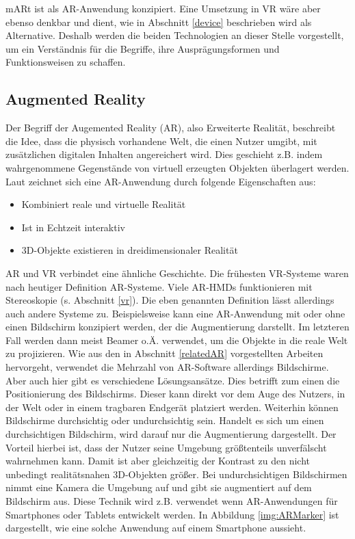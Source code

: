 mARt ist als AR-Anwendung konzipiert. Eine Umsetzung in VR wäre aber ebenso denkbar und dient, wie in Abschnitt \ref{device} beschrieben wird als Alternative.
Deshalb werden die beiden Technologien an dieser Stelle vorgestellt, um ein Verständnis für die Begriffe, ihre Ausprägungsformen und Funktionsweisen zu schaffen.

\subsection{Augmented Reality}

Der Begriff der Augemented Reality (AR), also Erweiterte Realität, beschreibt die Idee, dass die physisch vorhandene Welt, die einen Nutzer umgibt, mit zusätzlichen digitalen Inhalten angereichert wird. Dies geschieht z.B. indem wahrgenommene Gegenstände von virtuell erzeugten Objekten überlagert werden. 
Laut \cite{azuma97} zeichnet sich eine AR-Anwendung durch folgende Eigenschaften aus:

\begin{itemize}
\item Kombiniert reale und virtuelle Realität
\item Ist in Echtzeit interaktiv
\item 3D-Objekte existieren in dreidimensionaler Realität
\end{itemize}

AR und VR verbindet eine ähnliche Geschichte. Die frühesten VR-Systeme waren nach heutiger Definition AR-Systeme. 
Viele AR-HMDs funktionieren mit Stereoskopie (s. Abschnitt \ref{vr}). Die eben genannten Definition lässt allerdings auch andere Systeme zu. 
Beispielsweise kann eine AR-Anwendung mit oder ohne einen Bildschirm konzipiert werden, der die Augmentierung darstellt. Im letzteren Fall werden dann meist Beamer o.Ä. verwendet, um die Objekte in die reale Welt zu projizieren. 
Wie aus den in Abschnitt \ref{relatedAR} vorgestellten Arbeiten hervorgeht, verwendet die Mehrzahl von AR-Software allerdings Bildschirme. 
Aber auch hier gibt es verschiedene Lösungsansätze. Dies betrifft zum einen die Positionierung des Bildschirms. Dieser kann direkt vor dem Auge des Nutzers, in der Welt oder in einem tragbaren Endgerät platziert werden.
Weiterhin können Bildschirme durchsichtig oder undurchsichtig sein. Handelt es sich um einen durchsichtigen Bildschirm, wird darauf nur die Augmentierung dargestellt. Der Vorteil hierbei ist, dass der Nutzer seine Umgebung größtenteils unverfälscht wahrnehmen kann. Damit ist aber gleichzeitig der Kontrast zu den nicht unbedingt realitätsnahen 3D-Objekten größer.
Bei undurchsichtigen Bildschirmen nimmt eine Kamera die Umgebung auf und gibt sie augmentiert auf dem Bildschirm aus. Diese Technik wird z.B. verwendet wenn AR-Anwendungen für Smartphones oder Tablets entwickelt werden. In Abbildung \ref{img:ARMarker} ist dargestellt, wie eine solche Anwendung auf einem Smartphone aussieht.

